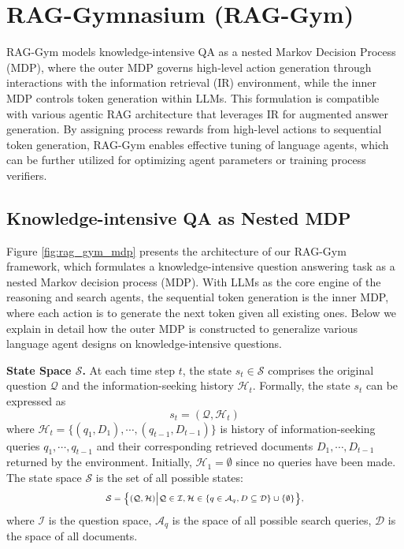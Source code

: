 \section{RAG-Gymnasium (RAG-Gym)}

RAG-Gym models knowledge-intensive QA as a nested Markov Decision Process (MDP), where the outer MDP governs high-level action generation through interactions with the information retrieval (IR) environment, while the inner MDP controls token generation within LLMs. This formulation is compatible with various agentic RAG architecture that leverages IR for augmented answer generation. By assigning process rewards from high-level actions to sequential token generation, RAG-Gym enables effective tuning of language agents, which can be further utilized for optimizing agent parameters or training process verifiers.

\subsection{Knowledge-intensive QA as Nested MDP}

Figure \ref{fig:rag_gym_mdp} presents the architecture of our RAG-Gym framework, which formulates a knowledge-intensive question answering task as a nested Markov decision process (MDP). With LLMs as the core engine of the reasoning and search agents, the sequential token generation is the inner MDP, where each action is to generate the next token given all existing ones. Below we explain in detail how the outer MDP is constructed to generalize various language agent designs on knowledge-intensive questions.

\noindent \textbf{State Space $\mathcal{S}$.} At each time step $t$, the state \(s_t \in \mathcal{S}\) comprises the original question \(\mathcal{Q}\) and the information-seeking history \(\mathcal{H}_t\). Formally, the state \(s_t\) can be expressed as
\begin{equation}
    s_t = (\mathcal{Q}, \mathcal{H}_t)
\end{equation}
where \(\mathcal{H}_t=\{(q_1, D_1),\cdots,(q_{t-1},D_{t-1})\}\) is history of information-seeking queries \(q_1, \cdots, q_{t-1}\) and their corresponding retrieved documents \(D_1, \cdots, D_{t-1}\) returned by the environment. 
Initially, \(\mathcal{H}_1=\emptyset\) since no queries have been made. 
The state space \(\mathcal{S}\) is the set of all possible states:
\begin{equation}\scriptsize
\begin{aligned}
    \mathcal{S} = \big\{(\mathcal{Q}, \mathcal{H})\big|\mathcal{Q} \in \mathcal{I}, \mathcal{H}\in \{q \in \mathcal{A}_q, D\subseteq \mathcal{D}\} \cup \{\emptyset\}\big\},
\end{aligned}
\end{equation}
where $\mathcal{I}$ is the question space, \(\mathcal{A}_q\) is the space of all possible search queries, \(\mathcal{D}\) is the space of all documents.

